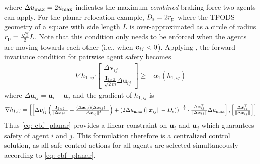 where $\Delta u_{\rm max} = 2 u_{\rm max}$ indicates the maximum \textit{combined} braking force two agents can apply. For the planar relocation example, $D_{\rm s} = 2r_{\rm p}$ where the TPODS geometry of a square with side length $L$ is over-approximated as a circle of radius $r_{\rm p} = \frac{\sqrt{2}}{2}L$. Note that this condition only needs to be enforced when the agents are moving towards each other (i.e., when $\Bar{\boldsymbol{v}}_{ij}< 0$). Applying , the forward invariance condition for pairwise agent safety becomes
\begin{align} \label{eq: cbf_planar}
    \nabla h_{1,ij} \boldsymbol{\cdot}
    \begin{bmatrix}
        \Delta \boldsymbol{v}_{ij} \\
        \frac{\boldsymbol{I}_{2\times2}}{\sqrt{2}m} \Delta \boldsymbol{u}_{ij}
    \end{bmatrix}
    \geq -\alpha_{1}(h_{1,ij})
\end{align}
where $\Delta \boldsymbol{u}_{ij} = \boldsymbol{u}_i - \boldsymbol{u}_j$ and the gradient of $h_{1,ij}$ is
\begin{align*}
    \nabla h_{1,ij} = 
    \begin{bmatrix}
        \begin{bmatrix}
                    \Delta\boldsymbol{v}_{i j}^{\top}\left(\frac{\boldsymbol{I}_{2\times2}}{\left\|\Delta \boldsymbol{x}_{i j}\right\|}-\frac{\left(\Delta \boldsymbol{x}_{i j}\right)\left(\Delta \boldsymbol{x}_{i j}\right)^{\top}}{\left\|\Delta \boldsymbol{x}_{i j}\right\|^3}\right) + \left(2 \Delta u_{\rm max}\left(\left\|\boldsymbol{x}_{i j}\right\|- D_{\rm s
                    }\right)\right)^{-\frac{1}{2}} \cdot \frac{\Delta \boldsymbol{x}_{i j}^{\top}}{\left\|\Delta \boldsymbol{x}_{i j}\right\|} \Delta u_{\rm max}
        \end{bmatrix},
        \begin{bmatrix}
            \frac{\Delta \boldsymbol{x}_{ij}^{\top}}{\left\Vert \Delta \boldsymbol{x}_{ij} \right\Vert}
        \end{bmatrix}
    \end{bmatrix}
\end{align*}
Thus \eqref{eq: cbf_planar} provides a linear constraint on $\boldsymbol{u}_i$ and $\boldsymbol{u}_j$ which guarantees safety of agent $i$ and $j$. This formulation therefore is a centralized control solution, as all safe control actions for all agents are selected simultaneously according to \eqref{eq: cbf_planar}.

